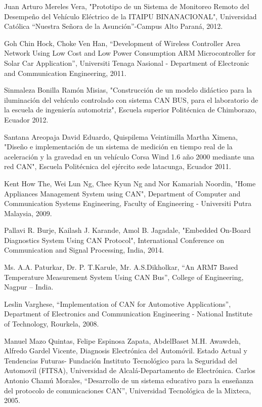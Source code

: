 \begin{thebibliography}{99}
 Juan Arturo Mereles Vera, "Prototipo de un Sistema de Monitoreo Remoto del Desempeño del Vehículo Eléctrico de la ITAIPU BINANACIONAL", Universidad Católica “Nuestra Señora de la Asunción”-Campus Alto Paraná, 2012. 

 Goh Chin Hock, Choke Ven Han, “Development of Wireless Controller Area Network Using Low Cost and Low Power Consumption ARM Microcontroller for Solar Car Application”, Universiti Tenaga Nasional - Department of Electronic and Communication Engineering, 2011.

 Sinmaleza Bonilla Ramón Misias, "Construcción de un modelo didáctico para la iluminación del vehículo controlado con sistema CAN BUS, para el laboratorio de la escuela de  ingeniería automotriz",  Escuela superior Politécnica de Chimborazo, Ecuador 2012.

Santana Areopaja David Eduardo, Quispilema Veintimilla Martha Ximena, "Diseño e implementación de un sistema de medición en tiempo real de la aceleración y la gravedad en un vehículo Corsa Wind 1.6 año 2000 mediante una red CAN", Escuela Politécnica del ejército sede latacunga, Ecuador 2011.

 Kent How The, Wei Lun Ng, Chee Kyun Ng and Nor Kamariah Noordin, "Home Appliances Management System using CAN", Department of Computer and Communication Systems Engineering, Faculty of Engineering - Universiti Putra Malaysia, 2009.

 Pallavi R. Burje, Kailash J. Karande, Amol B. Jagadale, "Embedded On-Board Diagnostics System Using CAN Protocol", International Conference on Communication and Signal Processing, India, 2014.

 Ms. A.A. Paturkar, Dr. P. T.Karule, Mr. A.S.Dikholkar, “An ARM7 Based Temperature Measurement System Using CAN Bus”, College of Engineering, Nagpur – India.

 Leslin Varghese, “Implementation of CAN for Automotive Applications”, Department of Electronics and Communication Engineering - National Institute of Technology, Rourkela, 2008.


 Manuel Mazo Quintas, Felipe Espinosa Zapata, AbdelBaset M.H. Awawdeh, Alfredo Gardel Vicente, Diagnosis Electrónica del Automóvil. Estado Actual y Tendencias Futuras- Fundación Instituto Tecnológico para la Seguridad del Automovil (FITSA), Universidad de Alcalá-Departamento de Electrónica.
 Carlos Antonio Chamú Morales, “Desarrollo de un sistema educativo para la enseñanza del protocolo de comunicaciones CAN”, Universidad Tecnológica de la Mixteca, 2005.


\end{thebibliography}
